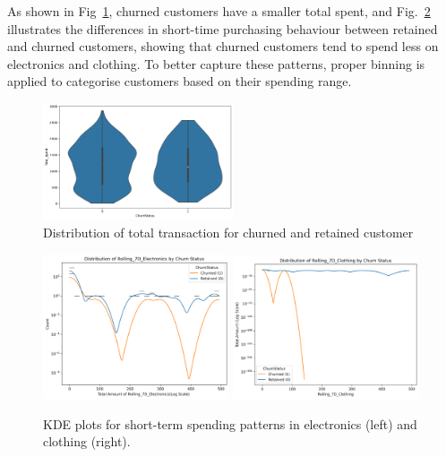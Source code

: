 \documentclass[journal=gmj]{CUP-JNL-DTM}%
\theoremstyle{definition}
\numberwithin{equation}{section}
\begin{document}
As shown in Fig~\ref{fig:violin_total}, churned customers have a smaller total spent, and Fig.~\ref{fig:KDE} illustrates the differences in short-time purchasing behaviour between retained and churned customers, showing that churned customers tend to spend less on electronics and clothing. To better capture these patterns, proper binning is applied to categorise customers based on their spending range. 


\begin{figure}[h]
    \centering
    \includegraphics[width=0.5\textwidth]{Plots/violin_total_spent.png}
    \caption{Distribution of total transaction for churned and retained customer}
    \label{fig:violin_total}
\end{figure}

\begin{figure}[h]
    \centering
    \includegraphics[width=0.49\textwidth]{Plots/KDE_RollingElectronics.png}
    \includegraphics[width=0.49\textwidth]{Plots/KDE_RollingClothing.png}
    \caption{KDE plots for short-term spending patterns in electronics (left) and clothing (right). }
    \label{fig:KDE}
\end{figure}
\end{document}
